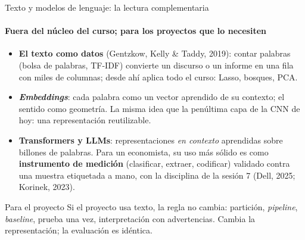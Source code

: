\documentclass{beamer}
\newcommand{\1}{\mathbb{I}}
\begin{document}
\begin{frame}{Texto y modelos de lenguaje: la lectura complementaria}
\framesubtitle{Fuera del núcleo del curso; para los proyectos que lo necesiten}
\small
\begin{itemize}\itemsep2pt
  \item \textbf{El texto como datos} (Gentzkow, Kelly \& Taddy, 2019): contar palabras (bolsa de palabras, TF-IDF) convierte un discurso o un informe en una fila con miles de columnas; desde ahí aplica todo el curso: Lasso, bosques, PCA. \pause
  \item \textbf{\emph{Embeddings}}: cada palabra como un vector aprendido de su contexto; el sentido como geometría. La misma idea que la penúltima capa de la CNN de hoy: una representación reutilizable. \pause
  \item \textbf{Transformers y LLMs}: representaciones \emph{en contexto} aprendidas sobre billones de palabras. Para un economista, su uso más sólido es como \textbf{instrumento de medición} (clasificar, extraer, codificar) validado contra una muestra etiquetada a mano, con la disciplina de la sesión 7 (Dell, 2025; Korinek, 2023). \pause
\end{itemize}
\begin{block}{Para el proyecto}
Si el proyecto usa texto, la regla no cambia: partición, \emph{pipeline}, \emph{baseline}, prueba una vez, interpretación con advertencias. Cambia la representación; la evaluación es idéntica.
\end{block}
\end{frame}
\end{document}
